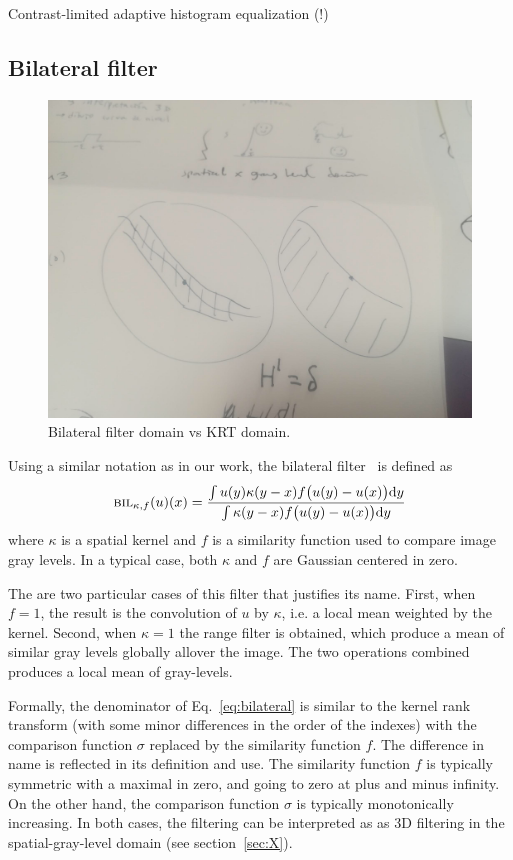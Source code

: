 \documentclass[12pt]{article}                  %
\begin{document}
Contrast-limited adaptive histogram equalization (!)

\subsection{Bilateral filter}

\begin{figure}[t]
	\begin{center}
		\includegraphics[width=0.7\linewidth]{f/bilateral-vs-krt.jpg}
	\end{center}
	\caption{\label{fig:bilateral-vs-krt}
	Bilateral filter domain vs KRT domain.
	}
\end{figure}

Using a similar notation as in our work, the bilateral
filter~\cite{tomasi1998bilateral,durand2002fast,paris2009bilateral} is defined
as
\begin{equation}\label{eq:bilateral}
\textsc{bil}_{\kappa,f}(u)(x) =
\frac{\int u(y) \kappa(y-x) f\big(u(y)-u(x)\big) \mathrm{d} y}
     {\int \kappa(y-x) f\big(u(y)-u(x)\big) \mathrm{d} y}
\end{equation}
where $\kappa$ is a spatial kernel and $f$ is a similarity function used to
compare image gray levels.  In a typical case, both $\kappa$ and $f$ are
Gaussian centered in zero.

The are two particular cases of this filter that justifies its name.  First,
when $f=1$, the result is the convolution of $u$ by $\kappa$, i.e. a local mean
weighted by the kernel.  Second, when $\kappa=1$ the range filter is obtained,
which produce a mean of similar gray levels globally allover the image.  The
two operations combined produces a local mean of gray-levels.

Formally, the denominator of Eq.~\ref{eq:bilateral} is similar to the kernel
rank transform (with some minor differences in the order of the indexes) with
the comparison function $\sigma$ replaced by the similarity function $f$.
The difference in name is reflected in its definition and use.  The similarity
function $f$ is typically symmetric with a maximal in zero, and going to
zero at plus and minus infinity.  On the other hand, the comparison function
$\sigma$ is typically monotonically increasing.  In both cases, the filtering
can be interpreted as as 3D filtering in the spatial-gray-level domain (see
section~\ref{sec:X}).
\end{document}
